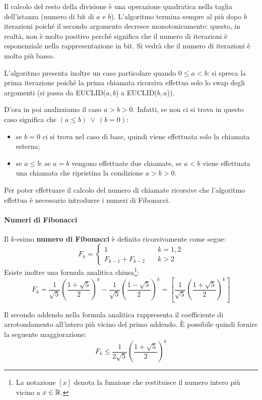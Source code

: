 Il calcolo del resto della divisione è una operazione quadratica nella taglia dell'istanza (numero di bit di $a$ e $b$). L'algoritmo termina sempre al più dopo $b$ iterazioni poiché il secondo argomento decresce monotonicamente: questo, in realtà, non è molto positivo perché significa che il numero di iterazioni è esponenziale nella rappresentazione in bit. Si vedrà che il numero di iterazioni è molto più basso.

L'algoritmo presenta inoltre un caso particolare quando $0\leq a < b$: si spreca la prima iterazione poiché la prima chiamata ricorsiva effettua solo lo swap degli argomenti (si passa da EUCLID($a,b$) a EUCLID($b,a$)). 

D'ora in poi analizziamo il caso $a > b > 0$. Infatti, se non ci si trova in questo caso significa che $(a\leq b)\ \lor\ (b=0)$:
\begin{itemize}
\item se $b=0$ ci si trova nel caso di base, quindi viene effettuata solo la chiamata esterna;
\item se $a\leq b$: se $a=b$ vengono effettuate due chiamate, se $a<b$ viene effettuata una chiamata che ripristina la condizione $a > b > 0$.
\end{itemize}

Per poter effettuare il calcolo del numero di chiamate ricorsive che l'algoritmo effettua è necessario introdurre i numeri di Fibonacci.

\paragraph*{Numeri di Fibonacci}
{
\begin{definizione}
Il $k$-esimo \textbf{numero di Fibonacci} è definito ricorsivamente come segue:
\[
F_k=
\begin{cases}
1 \quad &k=1,2 \\
F_{k-1}+F_{k-2} \quad &k>2
\end{cases}
\]
Esiste inoltre una formula analitica chiusa\footnote{La notazione $[x]$ denota la funzione che restituisce il numero intero più vicino a $x\in\operatorname*{\mathbb{R}}$.}:
\[
F_k=\frac{1}{\sqrt{5}}\left(\frac{1+\sqrt{5}}{2}\right)^k-\frac{1}{\sqrt{5}}\left(\frac{1-\sqrt{5}}{2}\right)^k=\left[\frac{1}{\sqrt{5}}\left(\frac{1+\sqrt{5}}{2}\right)^k\right]
\]
\end{definizione}
Il secondo addendo nella formula analitica rappresenta il coefficiente di arrotondamento all'intero più vicino del primo addendo. È possibile quindi fornire la seguente maggiorazione:
\[
F_k\leq\frac{1}{2\sqrt{5}}\left(\frac{1+\sqrt{5}}{2}\right)^k
\]
}

